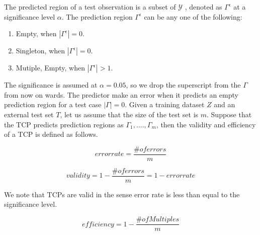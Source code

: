 \documentclass[main]{subfiles}
\begin{document}
The predicted region of a test observation is a subset of $\mathcal{Y}$ , denoted as $\Gamma^{\epsilon}$ at a significance level $\alpha$. The prediction region $\Gamma^{\epsilon}$ can be any one of the following:
\begin{enumerate}
\item Empty, when $|\Gamma^{\epsilon}| = 0$.
\item Singleton, when $|\Gamma^{\epsilon}| = 0$.
\item Mutiple, Empty, when $|\Gamma^{\epsilon}| >1$.
\end{enumerate}
The significance is assumed at $\alpha = 0.05$, so we drop the superscript from the $\Gamma$ from now on wards. The predictor make an error when it predicts an empty prediction region for a test case $|\Gamma| = 0$. Given a training dataset $Z$ and an external test set $T$,  let us assume that the size of the test set is $m$. Suppose that the TCP predicts prediction regions as $\Gamma_1, ...., \Gamma_m$, then the validity and efficiency of a TCP is defined as follows.

\begin{definition}
	\[ error rate= \frac{\# of errors}{m} \]
\end{definition}

\begin{definition}[Validity]
	\[ validity = 1-  \frac{\# of errors}{m} = 1-  error rate \]
\end{definition}

We note that TCPs are valid in the sense error rate is less than equal to the significance level.

\begin{definition}[Efficiency]
	\[ efficiency = 1-  \frac{\# of Multiples}{m} \]
\end{definition}
\end{document}
